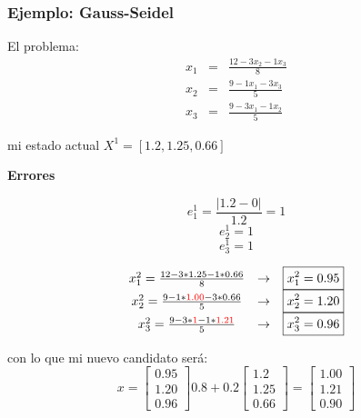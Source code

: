 \documentclass[xcolor=svgnames]{beamer} %
\theoremstyle{plain}
\renewcommand{\textbf}[1]{{\bfseries\textcolor{redUnq2}{#1}}}
\theoremstyle{definition}
\begin{document}
\begin{frame}
\frametitle{Ejemplo: Gauss-Seidel}

\begin{minipage}{.4\linewidth}
El problema:\vspace{-5pt}
$$\begin{array}{ccc}
x_1 &=& \frac{12-3x_2-1x_3}{8}\\
x_2 &=& \frac{9-1x_1-3x_3}{5}\\
x_3 &=& \frac{9-3x_1-1x_2}{5}
\end{array}$$

mi estado actual $X^1 =[1.2,1.25,0.66]$\vspace{-5pt}
\end{minipage} \vrule \begin{minipage}{.5\linewidth}
\begin{center}
  \textbf{Errores}
\end{center}
$$e_1^1 = \frac{|1.2 -0|}{1.2} = 1$$
$$e_2^1 = 1$$
$$e_3^1 = 1$$
\end{minipage}


\begin{minipage}{.55\linewidth}
\pause
\small
$$\begin{array}{cll}
x_1^2 = \frac{12-3*1.25-1*0.66}{8} &\rightarrow & \boxed{x_1^2 = 0.95}\\
x_2^2 = \frac{9-1*{\color{red}1.00}-3*0.66}{5} &\rightarrow & \boxed{x_2^2 = 1.20}\\
x_3^2 = \frac{9-3*{\color{red}1}-1*{\color{red}1.21}}{5} &\rightarrow & \boxed{x_3^2 = 0.96}
\end{array}$$

\end{minipage} \vrule \begin{minipage}{.35\linewidth}
\small
con lo que mi nuevo candidato será:
$$x = \begin{bmatrix}
0.95\\
1.20\\
0.96
\end{bmatrix} 0.8 +0.2\begin{bmatrix}
1.2\\
1.25\\
0.66
\end{bmatrix} = \begin{bmatrix}
1.00\\
1.21\\
0.90
\end{bmatrix}$$

\end{minipage}
\end{frame}
\end{document}
